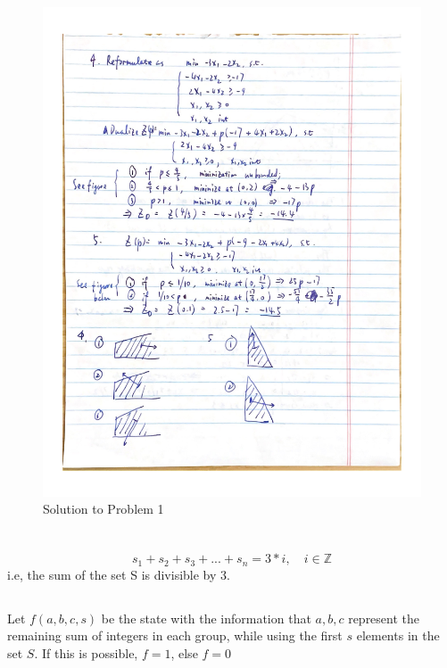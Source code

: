 \documentclass{article}
\begin{document}
\begin{figure}[!ht]
    \includegraphics[width=\textwidth]{1.2.png}
    \caption{Solution to Problem 1}
\end{figure}

\section{}
\subsection{}
$$
s_1+ s_2 + s_3 + ... + s_n = 3*i, \quad i \in \mathbb{Z} 
$$ 
i.e, the sum of the set S is divisible by 3.

\subsection{}

Let $f(a, b, c, s)$ be the state with the information that $a, b, c$ represent the remaining sum of integers in each group, while using the first $s$ elements in the set $S$. If this is possible, $f=1$, else $f=0$
\end{document}
